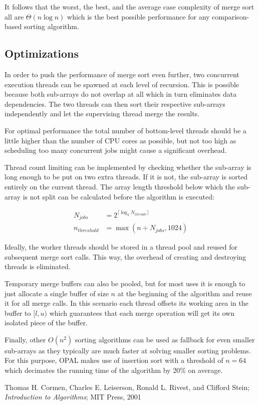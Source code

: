 \documentclass[titlepage, a4paper, 12pt]{article}
\begin{document}
    It follows that the worst, the best, and the average case complexity of merge sort all are $\Theta(n \log n)$ which is the best possible performance for any comparison-based sorting algorithm.

    \subsection{Optimizations}

    In order to push the performance of merge sort even further, two concurrent execution threads can be spawned at each level of recursion. This is possible because both sub-arrays do not overlap at all which in turn eliminates data dependencies. The two threads can then sort their respective sub-arrays independently and let the supervising thread merge the results.

    For optimal performance the total number of bottom-level threads should be a little higher than the number of CPU cores as possible, but not too high as scheduling too many concurrent jobs might cause a significant overhead.

    Thread count limiting can be implemented by checking whether the sub-array is long enough to be put on two extra threads. If it is not, the sub-array is sorted entirely on the current thread. The array length threshold below which the sub-array is not split can be calculated before the algorithm is executed:

    \begin{equation*}
        \begin{aligned}
            N_{jobs} &= 2^{\lceil \log_2 N_{threads} \rceil} \\
            n_{threshold} &= \max(n \div N_{jobs}, 1024)
        \end{aligned}
    \end{equation*}

    Ideally, the worker threads should be stored in a thread pool and reused for subsequent merge sort calls. This way, the overhead of creating and destroying threads is eliminated.

    Temporary merge buffers can also be pooled, but for most uses it is enough to just allocate a single buffer of size $n$ at the beginning of the algorithm and reuse it for all merge calls. In this scenario each thread offsets its working area in the buffer to $[l, u)$ which guarantees that each merge operation will get its own isolated piece of the buffer.

    Finally, other $O(n^2)$ sorting algorithms can be used as fallback for even smaller sub-arrays as they typically are much faster at solving smaller sorting problems. For this purpose, OPAL makes use of insertion sort with a threshold of $n = 64$ which decimates the running time of the algorithm by 20\% on average.

    \clearpage
    \begin{thebibliography}{1}
        Thomas H. Cormen, Charles E. Leiserson, Ronald L. Rivest, and Clifford Stein;
        \newblock \emph{Introduction to Algorithms};
        \newblock MIT Press, 2001
    \end{thebibliography}
\end{document}
